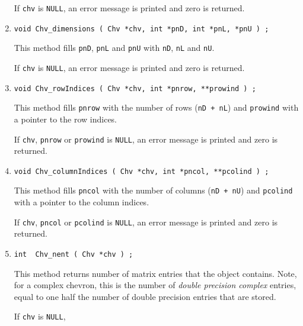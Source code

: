 \begin{enumerate}
If {\tt chv} is {\tt NULL},
an error message is printed and zero is returned.
\item
\begin{verbatim}
void Chv_dimensions ( Chv *chv, int *pnD, int *pnL, *pnU ) ;
\end{verbatim}
This method 
fills {\tt *pnD}, {\tt *pnL} and {\tt *pnU}
with {\tt nD}, {\tt nL} and {\tt nU}.
\par {}
If {\tt chv} is {\tt NULL},
an error message is printed and zero is returned.
\item
\begin{verbatim}
void Chv_rowIndices ( Chv *chv, int *pnrow, **prowind ) ;
\end{verbatim}
This method fills {\tt *pnrow} with the number of rows ({\tt nD + nL})
and {\tt *prowind} with a pointer to the row indices.
\par {}
If {\tt chv}, {\tt pnrow} or {\tt prowind} is {\tt NULL},
an error message is printed and zero is returned.
\item
\begin{verbatim}
void Chv_columnIndices ( Chv *chv, int *pncol, **pcolind ) ;
\end{verbatim}
This method fills {\tt *pncol} with the number of columns 
({\tt nD + nU})
and {\tt *pcolind} with a pointer to the column indices.
\par {}
If {\tt chv}, {\tt pncol} or {\tt pcolind} is {\tt NULL},
an error message is printed and zero is returned.
\item
\begin{verbatim}
int  Chv_nent ( Chv *chv ) ;
\end{verbatim}
This method returns number of matrix entries that the object contains.
Note, for a complex chevron,
this is the number of {\it double precision complex} entries,
equal to one half the number of double precision entries 
that are stored.
\par {}
If {\tt chv} is {\tt NULL},

\end{enumerate}
